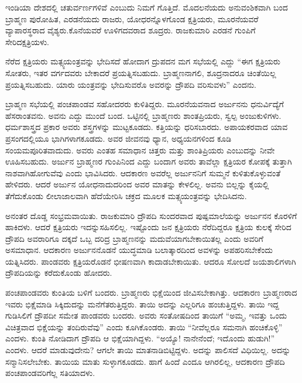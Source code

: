 \vskip 0.1cm

ಇಂಡಿಯಾ ದೇಶದಲ್ಲಿ ಚತುರ್ವರ್ಣಗಳಿವೆ ಎಂಬುದು ನಿಮಗೆ ಗೊತ್ತಿದೆ. ಮೊದಲನೆಯದು ಅನುವಂಶಿಕವಾಗಿ ಬಂದ ಬ್ರಾಹ್ಮಣ ಪುರೋಹಿತ, ಎರಡನೆಯದು ರಾಜರು, ಯೋಧರನ್ನೊಳಗೊಂಡ ಕ್ಷತ್ರಿಯರು, ಮೂರನೆಯವರೆ ವ್ಯಾಪಾರಸ್ಥರಾದ ವೈಶ್ಯರು.\break ಕೊನೆಯವರೆ ಊಳಿಗದವರಾದ ಶೂದ್ರರು. ರಾಜಕುಮಾರಿ ಎರಡನೆ ಗುಂಪಿಗೆ ಸೇರಿದ\break ಕ್ಷತ್ರಿಯಳು.

\vskip 0.1cm

ನೆರೆದ ಕ್ಷತ್ರಿಯರು ಮತ್ಸ್ಯಯಂತ್ರವನ್ನು ಭೇದಿಸದೆ ಹೋದಾಗ ದ್ರುಪದನ ಮಗ ಸಭೆಯಲ್ಲಿ ಎದ್ದು “ಈಗ ಕ್ಷತ್ರಿಯರು ಸೋತರು, ಇತರ ವರ್ಗದವರು ಬೇಕಾದರೆ ಪ್ರಯತ್ನಿಸಬಹುದು. ಬ್ರಾಹ್ಮಣನಾಗಲಿ, ಶೂದ್ರನಾದರೂ ಚಿಂತೆಯಿಲ್ಲ ಪ್ರಯತ್ನಿಸಬಹುದು. ಯಾರು ಯಂತ್ರವನ್ನು ಭೇದಿಸುವರೊ ಅವರನ್ನು ದ್ರೌಪದಿ ವರಿಸುವಳು” ಎಂದನು.

\vskip 0.1cm

ಬ್ರಾಹ್ಮಣ ಸಭೆಯಲ್ಲಿ ಪಂಚಪಾಂಡವ ಸಹೋದರರು ಕುಳಿತಿದ್ದರು. ಮೂರನೆಯವನಾದ ಅರ್ಜುನನು ಧನುರ್ವಿದ್ಯೆಗೆ ಹೆಸರಾಂತವನು. ಅವನು ಎದ್ದು ಮುಂದೆ ಬಂದ. ಒಟ್ಟಿನಲ್ಲಿ ಬ್ರಾಹ್ಮಣರು ಶಾಂತಪ್ರಿಯರು, ಸ್ವಲ್ಪ ಅಂಜುಕುಳಿಗಳು. ಧರ್ಮಶಾಸ್ತ್ರದ ಪ್ರಕಾರ ಅವರು ಶಸ್ತ್ರಗಳನ್ನು ಮುಟ್ಟಕೂಡದು. ಕತ್ತಿಯನ್ನು ಧರಿಸಬಾರದು. ಅಪಾಯಕರವಾದ ಯಾವ ಪ್ರಸಂಗದಲ್ಲಿಯೂ ಭಾಗಿಗಳಾಗಕೂಡದು. ಅವರ ಜೀವನವು ಧ್ಯಾನ, ಅಧ್ಯಯನಗಳಿಂದ ಕೂಡಿ ಸಂಯಮಪೂರಿತವಾದುದು. ಅವರು ಎಂತಹ ಸಮಾಧಾನ ಚಿತ್ತರು ಮತ್ತು ಶಾಂತಿಪ್ರಿಯರು ಎಂಬುದನ್ನು ನೀವೇ ಊಹಿಸಬಹುದು. ಅರ್ಜುನ ಬ್ರಾಹ್ಮಣರ ಗುಂಪಿನಿಂದ ಎದ್ದು ಬಂದಾಗ ಅವರು ತಾವೆಲ್ಲಾ ಕ್ಷತ್ರಿಯರ ಕೋಪಕ್ಕೆ ತುತ್ತಾಗಿ ನಾಶವಾಗಿ\break ಹೋಗುವೆವು ಎಂದು ಭಾವಿಸಿದರು. ಆದಕಾರಣ ಅವರೆಲ್ಲ ಅರ್ಜುನನಿಗೆ ಸುಮ್ಮನೆ ಕುಳಿತುಕೊಳ್ಳುವಂತೆ ಹೇಳಿದರು. ಆದರೆ ಅರ್ಜುನ ಯೋಧನಾದುದರಿಂದ ಅವರ ಮಾತನ್ನು ಕೇಳಲಿಲ್ಲ. ಅವನು ಬಿಲ್ಲನ್ನು ಕೈಯಲ್ಲಿ ತೆಗೆದುಕೊಂಡು ಲೀಲಾಜಾಲವಾಗಿ ಹೆದೆಯೇರಿಸಿ ಚಕ್ರದ ಮೂಲಕ ಮತ್ಸ್ಯಯಂತ್ರವನ್ನು ಭೇದಿಸಿದನು.

ಅನಂತರ ದೊಡ್ಡ ಸಂಭ್ರಮವಾಯಿತು. ರಾಜಕುಮಾರಿ ದ್ರೌಪದಿ ಸುಂದರವಾದ ಪುಷ್ಪಮಾಲೆಯನ್ನು ಅರ್ಜುನನ ಕೊರಳಿಗೆ ಹಾಕಿದಳು. ಆದರೆ ಕ್ಷತ್ರಿಯರು ಇದನ್ನು\break ಸಹಿಸಲಿಲ್ಲ. ಇಷ್ಟೊಂದು ಜನ ಕ್ಷತ್ರಿಯರು ನೆರೆದಿದ್ದರೂ ಕ್ಷತ್ರಿಯ ಕುಲಕ್ಕೆ ಸೇರಿದ ದ್ರೌಪದಿ ಅವರಾರಿಗೂ ದಕ್ಕದೆ ಒಬ್ಬ ದರಿದ್ರ ಬ್ರಾಹ್ಮಣನನ್ನು ಮದುವೆಯಾಗಬೇಕಾಯಿತಲ್ಲ ಎಂದು ಅವರಿಗೆ ಅಸಮಾಧಾನ. ಆದಕಾರಣ ಅರ್ಜುನನೊಡನೆ ಯುದ್ಧಮಾಡಿ ಬಲಾತ್ಕಾರದಿಂದ ಅವಳನ್ನು ಅಪಹರಿಸಬೇಕೆಂದು ಯತ್ನಿಸಿದರು. ಪಾಂಡವರು ಕ್ಷತ್ರಿಯರೊಡನೆ ಭೀಷಣವಾಗಿ ಕಾದಾಡಬೇಕಾಯಿತು. ಆದರೂ ಸೋಲದೆ ಜಯಶಾಲಿಗಳಾಗಿ ದ್ರೌಪದಿಯನ್ನು ಕರೆದುಕೊಂಡು ಹೋದರು.

ಪಂಚಪಾಂಡವರು ಕುಂತಿಯ ಬಳಿಗೆ ಬಂದರು. ಬ್ರಾಹ್ಮಣರು ಭಿಕ್ಷೆಯಿಂದ ಜೀವಿಸಬೇಕಾಗಿತ್ತು. ಆದಕಾರಣ ಬ್ರಾಹ್ಮಣರಾದ ಇವರು ಭಿಕ್ಷೆಮಾಡಿ ಸಿಕ್ಕಿದುದನ್ನು ಮನೆಗೆ\break ತರುತ್ತಿದ್ದರು. ತಾಯಿ ಅದನ್ನು ಎಲ್ಲರಿಗೂ ಹಂಚುತ್ತಿದ್ದಳು. ತಾಯಿ ಇದ್ದ ಗುಡಿಸಿಲಿಗೆ ದ್ರೌಪದೀ ಸಮೇತ ಪಾಂಡವರು ಬಂದರು. ಅವರು ಸಂತೋಷದಿಂದ ತಾಯಿಗೆ “ಅಮ್ಮ, ಇವತ್ತು ಒಂದು ವಿಚಿತ್ರವಾದ ಭಿಕ್ಷೆಯನ್ನು ತಂದಿರುವೆವು” ಎಂದು ಕೂಗಿಕೊಂಡರು. ತಾಯಿ “ನೀವೆಲ್ಲರೂ ಸಮನಾಗಿ ಹಂಚಿಕೊಳ್ಳಿ” ಎಂದಳು. ಕುಂತಿ ನೋಡಿದಾಗ ದ್ರೌಪದಿ ಆ ಭಿಕ್ಷೆಯಾಗಿದ್ದಳು. “ಅಯ್ಯೊ! ನಾನೇನೆಂದೆ; ಇದೊಂದು ಹುಡುಗಿ!” ಎಂದಳು. ಆದರೆ ಮಾಡುವುದೇನು? ಆಗಲೇ ತಾಯಿ ಮಾತನಾಡಿಬಿಟ್ಟಿದ್ದಳು. ಅದನ್ನು ಪಾಲಿಸದೆ ವಿಧಿಯಿಲ್ಲ. ಅದನ್ನು ಸನ್ಮಾನಿಸಲೇಬೇಕು. ತಾಯಿಯ ಮಾತು ಸುಳ್ಳಾಗಕೂಡದು. ಹಾಗೆ ಹಿಂದೆ ಎಂದೂ ಆಗಿರಲಿಲ್ಲ, ಆದಕಾರಣ ದ್ರೌಪದಿ ಪಂಚಪಾಂಡವರಿಗೆಲ್ಲ ಸತಿಯಾದಳು.


